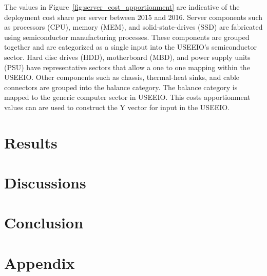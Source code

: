         The values in Figure~\ref{fig:server_cost_apportionment} are indicative of the deployment cost share per server between 2015 and 2016. Server components such as processors (CPU), memory (MEM), and solid-state-drives (SSD) are fabricated using semiconductor manufacturing processes. These components are grouped together and are categorized as a single input into the USEEIO’s semiconductor sector. Hard disc drives (HDD), motherboard (MBD), and power supply units (PSU) have representative sectors that allow a one to one mapping within the USEEIO. Other components such as chassis, thermal-heat sinks, and cable connectors are grouped into the balance category. The balance category is mapped to the generic computer sector in USEEIO. This costs apportionment values can are used to construct the Y vector for input in the USEEIO.
        
        
        
        
        
        

\section{Results}
    
\section{Discussions}
\section{Conclusion}
\newpage
\section{Appendix}
        